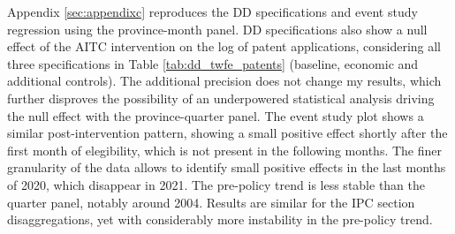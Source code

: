 \documentclass[../main.tex]{subfiles}
\begin{document}
Appendix \ref{sec:appendixc} reproduces the DD specifications and event study regression using the province-month panel. DD specifications also show a null effect of the AITC intervention on the log of patent applications, considering all three specifications in Table \ref{tab:dd_twfe_patents} (baseline, economic and additional controls). The additional precision does not change my results, which further disproves the possibility of an underpowered statistical analysis driving the null effect with the province-quarter panel. The event study plot shows a similar post-intervention pattern, showing a small positive effect shortly after the first month of elegibility, which is not present in the following months. The finer granularity of the data allows to identify small positive effects in the last months of 2020, which disappear in 2021. The pre-policy trend is less stable than the quarter panel, notably around 2004. Results are similar for the IPC section disaggregations, yet with considerably more instability in the pre-policy trend. 
\end{document}
